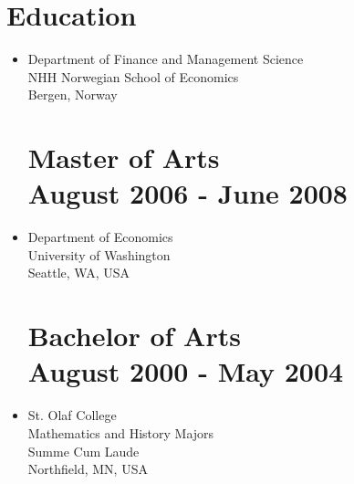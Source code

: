 \documentclass[margin]{res}
\begin{document}
\begin{itemize}
\end{itemize}

\section{Education}

\begin{itemize}
\normalsize{\section{Ph.D. Management Science \\ August 2008 - May 2012}}
\item[] Department of Finance and Management Science\\
NHH Norwegian School of Economics \\
Bergen, Norway \\

\normalsize{\section{\bf Master of Arts \\ August 2006 - June 2008}}
\item[] Department of Economics \\
University of Washington \\
Seattle, WA, USA \\

\normalsize{\section{\bf Bachelor of Arts \\ August 2000 - May 2004}}
\item[] St. Olaf College  \\
Mathematics and History Majors \\
Summe Cum Laude \\
Northfield, MN, USA \\
\end{itemize}
\end{document}

